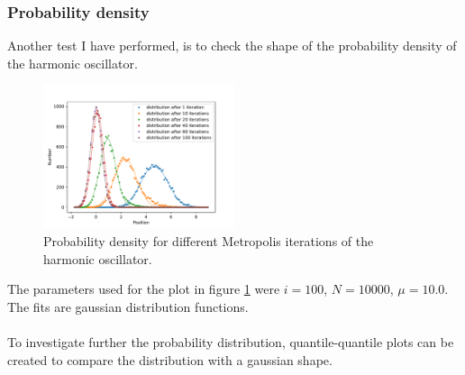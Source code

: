 \documentclass{scrartcl}
\begin{document}
	\subsubsection{Probability density}
		Another test I have performed, is to check the shape of the probability density of the harmonic oscillator.
		\begin{figure}[H]
			\centering
				\includegraphics[width=0.5\textwidth]{../imgs/harmonic_oscillator_track/track_10010000_gauss_1_fit.pdf}
			\caption{Probability density for different Metropolis iterations of the harmonic oscillator.}
			\label{fig:harmonic_oscillator_track_10010000_gauss_1_fit}
		\end{figure}
		The parameters used for the plot in figure \ref{fig:harmonic_oscillator_track_10010000_gauss_1_fit} were $i=100$, $N=10000$, $\mu = 10.0$.
		The fits are gaussian distribution functions.
		\\\\
		To investigate further the probability distribution, quantile-quantile plots can be created to compare the distribution with a gaussian shape.
\end{document}

